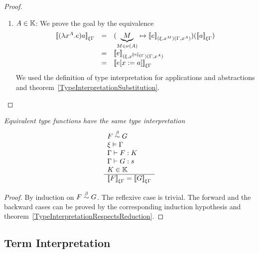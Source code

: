 \begin{theorem}
\begin{proof}
\begin{enumerate}
        \item $A \in \mathbb{K}$: We prove the goal by the equivalence
            $$
            \begin{array}{lll}
                \typeinter{(\lambda x^A.e)a}{\xi\Gamma}
                &=&
                (
                    \underbrace M_{M \in \nu(A)}
                    \mapsto
                    \typeinter{e}{(\xi,x^M)(\Gamma,x^A)}
                )
                (
                    \typeinter{a}{\xi\Gamma}
                )
                \\
                &=&
                \typeinter
                {e}
                {(\xi,x^{\typeinter{a}{\xi\Gamma}})(\Gamma,x^A)}
                \\
                &=&
                \typeinter{e[x:=a]}{\xi\Gamma}
            \end{array}
            $$
            We used the definition of type interpretation for applications and
                abstractions and
                theorem~\ref{TypeInterpretationSubstitution}.
        \end{enumerate}
    \end{proof}
\end{theorem}





\begin{theorem}
    \label{TypeInterpretationEquivalence}
    \emph{Equivalent type functions have the same type interpretation}
    $$
    \begin{array}{l} 
        F \stackrel{\beta}{\sim} G
        \\
        \xi \vDash \Gamma
        \\
        \Gamma \vdash F : K
        \\
        \Gamma \vdash G : s
        \\
        K \in \mathbb{K}
     \\ \hline 
        {{[\![}F{]\!]}}_{\xi\Gamma} = {{[\![} G{]\!]}}_{\xi\Gamma}
    \end{array}
    $$
    \begin{proof} By induction on $F \stackrel{\beta}{\sim} G$. The reflexive case is trivial.
        The forward and the backward cases can be proved by the corresponding
        induction hypothesis and
        theorem~\ref{TypeInterpretationRespectsReduction}.
    \end{proof}
\end{theorem}




\subsection{Term Interpretation}

